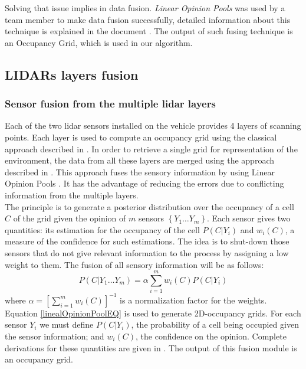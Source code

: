 Solving that issue implies in data fusion. \textit{Linear Opinion Pools} was used by a team member to make data fusion successfully, detailed information about this technique is explained in the document \cite{ADARVE-2012-671211}. The output of such fusing technique is an Occupancy Grid, which is used in our algorithm.

\subsection{LIDARs layers fusion}

\subsubsection{Sensor fusion from the multiple lidar layers}
Each of the  two lidar sensors installed on the vehicle provides 4 layers of scanning points. Each layer is used to compute an occupancy grid using the classical approach described in \cite{Thrun05}. In order to retrieve a single grid for representation of the environment, the data from all these layers are merged using the approach described in \cite{ADARVE-2012-671211}. This approach fuses the sensory information by using Linear Opinion Pools \cite{DeGroot1974}. It has the advantage of reducing the errors due to conflicting information from the multiple layers.\\
The principle is to generate a posterior distribution over the occupancy of a cell $C$ of the grid given the opinion of $m$ sensors $\left\{ Y_1 \dots Y_m \right\}$.
Each sensor gives two quantities: its estimation for the occupancy of the cell $P(C | Y_i)$ and $w_i(C)$, a measure of the confidence for such estimations.
The idea is to shut-down those sensors that do not give relevant information to the process by assigning a low weight to them. The fusion of all sensory information will be as follows:
\begin{equation}
\label{linealOpinionPoolEQ}
  P(C | Y_1 \dots Y_m) = \alpha \sum \limits^m_{i=1} w_i(C) P(C | Y_i)
\end{equation}
where $\alpha = \left[ \sum \limits^m_{i=1} w_i(C) \right]^{-1}$ is a normalization factor for the weights.  Equation \eqref{linealOpinionPoolEQ} is used to generate
2D-occupancy grids. For each sensor $Y_i$ we must define $P(C | Y_i)$, the probability of a cell being occupied given the sensor information; and $w_i(C)$, the confidence on the opinion. Complete derivations for these quantities are given in \cite{ADARVE-2012-671211}. The output of this fusion module is an occupancy grid. %

